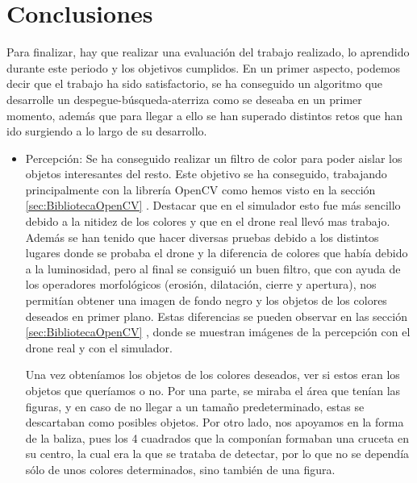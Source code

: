 \chapter{Conclusiones}\label{cap.conclusiones}

\hspace{1cm} Para finalizar, hay que realizar una evaluaci\'on del trabajo realizado, lo aprendido durante este periodo y los objetivos cumplidos. En un primer aspecto, podemos decir que el trabajo ha sido satisfactorio, se ha conseguido un algoritmo que desarrolle un despegue-b\'usqueda-aterriza como se deseaba en un primer momento, adem\'as que para llegar a ello se han superado distintos retos que han ido surgiendo a lo largo de su desarrollo.

\begin{itemize}
\item{Percepci\'on:} Se ha conseguido realizar un filtro de color para poder aislar los objetos interesantes del resto. Este objetivo se ha conseguido, trabajando principalmente con la librer\'ia OpenCV como hemos visto en la secci\'on \ref{sec:BibliotecaOpenCV} . Destacar que en el simulador esto fue m\'as sencillo debido a la nitidez de los colores y que en el drone real llev\'o mas trabajo. Adem\'as se han tenido que hacer diversas pruebas debido a los distintos lugares donde se probaba el drone y la diferencia de colores que hab\'ia debido a la luminosidad, pero al final se consigui\'o un buen filtro, que con ayuda de los operadores morfol\'ogicos (erosi\'on, dilataci\'on, cierre y apertura), nos permit\'ian obtener una imagen de fondo negro y los objetos de los colores deseados en primer plano. Estas diferencias se pueden observar en las secci\'on \ref{sec:BibliotecaOpenCV} , donde se muestran im\'agenes de la percepci\'on con el drone real y con el simulador.

\hspace{1cm} Una vez obten\'iamos los objetos de los colores deseados, ver si estos eran los objetos que quer\'iamos o no. Por una parte, se miraba el \'area que ten\'ian las figuras, y en caso de no llegar a un tamaño predeterminado, estas se descartaban como posibles objetos. Por otro lado, nos apoyamos en la forma de la baliza, pues los 4 cuadrados que la compon\'ian formaban una cruceta en su centro, la cual era la que se trataba de detectar, por lo que no se depend\'ia s\'olo de unos colores determinados, sino tambi\'en de una figura. 


\end{itemize}
